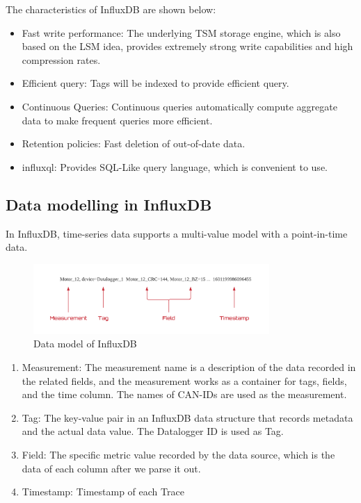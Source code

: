 The characteristics of InfluxDB are shown below:
\begin{itemize}
    \item Fast write performance: The underlying TSM storage engine, which is also based on the LSM idea, provides extremely strong write capabilities and high compression rates.
    \item Efficient query: Tags will be indexed to provide efficient query.
    \item Continuous Queries: Continuous queries automatically compute aggregate data to make frequent queries more efficient\cite{influxdb_features}.
    \item Retention policies: Fast deletion of out-of-date data.
    \item \ac{influxql}: Provides SQL-Like query language, which is convenient to use.
\end{itemize}

\subsection{Data modelling in InfluxDB}
In InfluxDB, time-series data supports a multi-value model with a point-in-time data\cite{alibaba_influxdb}.

\begin{figure}[hbt!]
	\centering
 	\includegraphics[width=0.8\textwidth]{gfx/influxdb_model.png}
	\caption{Data model of InfluxDB}
	\label{fig:influxdb_datamodel}
\end{figure}


\begin{enumerate}
    \item Measurement: 
    The measurement name is a description of the data recorded in the related fields, and the measurement works as a container for tags, fields, and the time column\cite{influxdb_glossary}. The names of CAN-IDs are used as the measurement.
    
    \item Tag:
    The key-value pair in an InfluxDB data structure that records metadata and the actual data value\cite{influxdb_glossary}. The Datalogger ID is used as Tag.
    \item Field:
    The specific metric value recorded by the data source, which is the data of each column after we parse it out.
    \item Timestamp: 
    Timestamp of each Trace
\end{enumerate}

